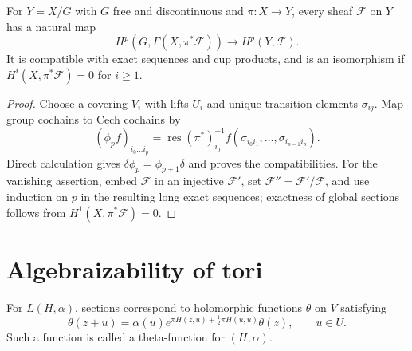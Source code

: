 \begin{theorem}
\label{mumford-source-quotient-cohomology}
For $Y=X/G$ with $G$ free and discontinuous and $\pi:X\to Y$, every sheaf
$\mathcal F$ on $Y$ has a natural map
\[
 H^p(G,\Gamma(X,\pi^*\mathcal F))\to H^p(Y,\mathcal F).
\]
It is compatible with exact sequences and cup products, and is an isomorphism
if $H^i(X,\pi^*\mathcal F)=0$ for $i\ge1$.
\end{theorem}
\begin{proof}
Choose a covering $V_i$ with lifts $U_i$ and unique transition elements
$\sigma_{ij}$. Map group cochains to Cech cochains by
\[
 (\phi_pf)_{i_0\ldots i_p}=\operatorname{res}(\pi^*)_{i_0}^{-1}
 f(\sigma_{i_0i_1},\ldots,\sigma_{i_{p-1}i_p}).
\]
Direct calculation gives $\delta\phi_p=\phi_{p+1}\delta$ and proves the
compatibilities. For the vanishing assertion, embed $\mathcal F$ in an
injective $\mathcal F'$, set $\mathcal F''=\mathcal F'/\mathcal F$, and use
induction on $p$ in the resulting long exact sequences; exactness of global
sections follows from $H^1(X,\pi^*\mathcal F)=0$.
\end{proof}

\section{Algebraizability of tori}
\label{mumford-source-I3}

For $L(H,\alpha)$, sections correspond to holomorphic functions $\theta$ on
$V$ satisfying
\[
 \theta(z+u)=\alpha(u)e^{\pi H(z,u)+\frac12\pi H(u,u)}\theta(z),
 \qquad u\in U.
\]
Such a function is called a theta-function for $(H,\alpha)$.

